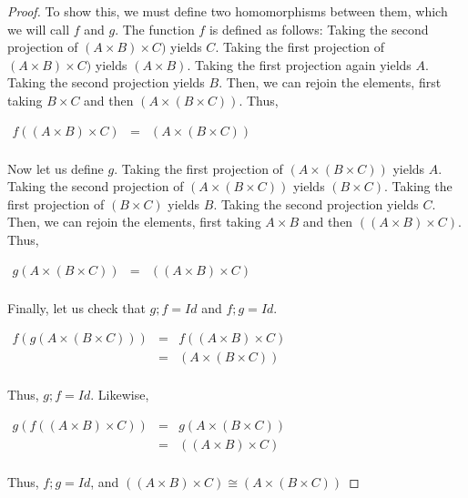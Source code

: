 \begin{proof}
To show this, we must define two homomorphisms between them, which we will call $f$ and $g$. 
The function $f$ is defined as follows: Taking the second projection of $(A \times B)\times C)$ yields $C$. Taking the first projection of $(A \times B)\times C)$ yields $(A \times B)$. Taking the first projection again yields $A$. Taking the second projection yields $B$. Then, we can rejoin the elements, first taking $B \times C$ and then $(A \times (B\times C)).$ Thus, 
\begin{center}
  \begin{math}
    \begin{array}{lll}
      f((A \times B)\times C) & = & (A \times (B\times C))\\
    \end{array}
  \end{math}
\end{center}
Now let us define $g$. Taking the first projection of $(A \times (B\times C))$ yields $A$. Taking the second projection of $(A \times (B\times C))$ yields $(B\times C)$. Taking the first projection of $(B\times C)$ yields $B$. Taking the second projection yields $C$. Then, we can rejoin the elements, first taking $A \times B$ and then $((A \times B)\times C).$ Thus, 
\begin{center}
  \begin{math}
    \begin{array}{lll}
      g(A \times (B\times C)) & = & ((A \times B)\times C)\\
    \end{array}
  \end{math}
\end{center}
Finally, let us check that $g;f = Id$ and $f;g=Id$.\\ 
\begin{center}
  \begin{math}
    \begin{array}{lll}
      f(g(A \times (B\times C))) & = & f((A \times B)\times C)\\
                                                 & = & (A \times (B\times C))\\
    \end{array}
  \end{math}
\end{center}
Thus, $g;f = Id$. Likewise,\\
\begin{center}
  \begin{math}
    \begin{array}{lll}
      g(f((A \times B)\times C)) & = & g(A \times (B\times C))\\
                                                 & = & ((A \times B)\times C)\\
    \end{array}
  \end{math}
\end{center}
Thus, $f;g = Id$, and $((A \times B)\times C) \cong (A \times (B\times C))$
\end{proof}

